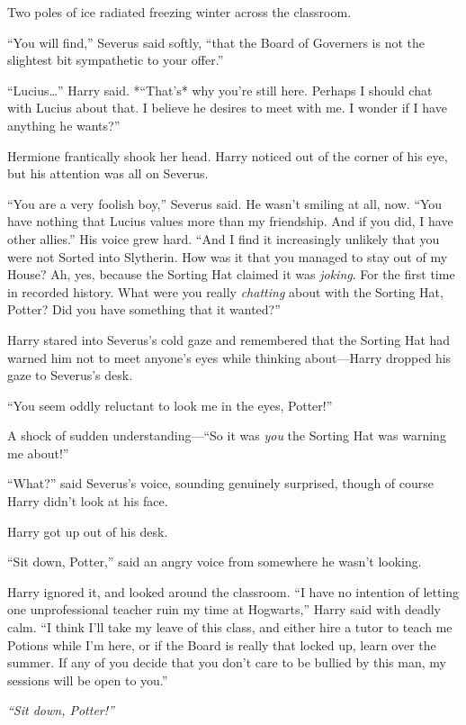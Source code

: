 Two poles of ice radiated freezing winter across the classroom.

``You will find,'' Severus said softly, ``that the Board of Governers is
not the slightest bit sympathetic to your offer.''

``Lucius\ldots{}'' Harry said. *``That's* why you're still here. Perhaps
I should chat with Lucius about that. I believe he desires to meet with
me. I wonder if I have anything he wants?''

Hermione frantically shook her head. Harry noticed out of the corner of
his eye, but his attention was all on Severus.

``You are a very foolish boy,'' Severus said. He wasn't smiling at all,
now. ``You have nothing that Lucius values more than my friendship. And
if you did, I have other allies.'' His voice grew hard. ``And I find it
increasingly unlikely that you were not Sorted into Slytherin. How was
it that you managed to stay out of my House? Ah, yes, because the
Sorting Hat claimed it was \emph{joking}. For the first time in recorded
history. What were you really \emph{chatting} about with the Sorting
Hat, Potter? Did you have something that it wanted?''

Harry stared into Severus's cold gaze and remembered that the Sorting
Hat had warned him not to meet anyone's eyes while thinking
about---Harry dropped his gaze to Severus's desk.

``You seem oddly reluctant to look me in the eyes, Potter!''

A shock of sudden understanding---``So it was \emph{you} the Sorting Hat
was warning me about!''

``What?'' said Severus's voice, sounding genuinely surprised, though of
course Harry didn't look at his face.

Harry got up out of his desk.

``Sit down, Potter,'' said an angry voice from somewhere he wasn't
looking.

Harry ignored it, and looked around the classroom. ``I have no intention
of letting one unprofessional teacher ruin my time at Hogwarts,'' Harry
said with deadly calm. ``I think I'll take my leave of this class, and
either hire a tutor to teach me Potions while I'm here, or if the Board
is really that locked up, learn over the summer. If any of you decide
that you don't care to be bullied by this man, my sessions will be open
to you.''

\emph{``Sit down, Potter!''}

